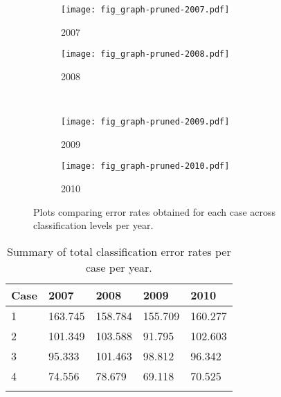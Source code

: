 \begin{figure}[!ht] \centering
	\captionsetup[subfigure]{width=2.0in} %
	\begin{subfigure}[t]{0.49\textwidth}
		\texttt{[image: fig\_graph-pruned-2007.pdf]}
		\caption[Error rates across levels per year.]{2007}
		\label{fig: result-fig4.14a}
	\end{subfigure}
	\begin{subfigure}[t]{0.49\textwidth}
		\texttt{[image: fig\_graph-pruned-2008.pdf]}
		\caption[Error rates across levels per year.]{2008}
		\label{fig: result-fig4.14b}
	\end{subfigure}\\
	\vspace{15pt}
	\begin{subfigure}[t]{0.49\textwidth}
		\texttt{[image: fig\_graph-pruned-2009.pdf]}
		\caption[Error rates across levels per year.]{2009}
		\label{fig: result-fig4.14c}
	\end{subfigure}
	\begin{subfigure}[t]{0.49\textwidth}
		\texttt{[image: fig\_graph-pruned-2010.pdf]}
		\caption[Error rates across levels per year.]{2010}
		\label{fig: result-fig4.14d}
	\end{subfigure}
	\vspace{5pt}
	\caption[Plots comparing error rates obtained for each case across classification levels per year.]{Plots comparing error rates obtained for each case across classification levels per year.}
	\label{fig: result-fig4.14}
\end{figure}

\begin{spacing}{1.0}
\begin{longtable}[h!]{ p{2.6cm} p{2.6cm} p{2.6cm} p{2.6cm} p{2.6cm} }

    \caption[Summary of total classification error rates per case per year.]{Summary of total classification error rates per case per year.}
    \label{tab: result-table4.3}\\
    
    	\toprule
    	Case & 2007 & 2008 & 2009 & 2010\\
    	\midrule
    	\endhead
    	
		1 & 163.745 & 158.784 & 155.709 & 160.277\\
		2 & 101.349 & 103.588 &  91.795 & 102.603\\
		3 &  95.333 & 101.463 &  98.812 &  96.342\\
		4 &  74.556 &  78.679 &  69.118 &  70.525\\
		
		\bottomrule \\
    
\end{longtable}
\end{spacing}

